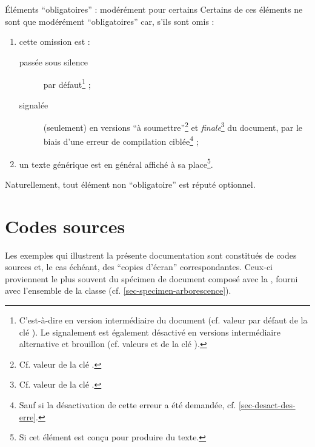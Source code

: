 \begin{dbremark}{Éléments \enquote{obligatoires} : modérément pour certains}{}
  Certains de ces éléments ne sont que modérément \enquote{obligatoires} car,
  s'ils sont omis :
  \begin{enumerate}
  \item cette omission est :
    \begin{description}
    \item[passée sous silence] par défaut\footnote{C'est-à-dire en version
        intermédiaire du document (cf. valeur par défaut 
        de la clé ). Le signalement est également désactivé en
        versions intermédiaire alternative et brouillon (cf. valeurs
         et  de la clé
        ).} ;
    \item[signalée] (seulement) en versions \enquote{à
        soumettre}\footnote{Cf. valeur  de la clé
        .} et \emph{finale}\footnote{Cf. valeur 
        de la clé .} du document, par le biais d'une erreur de
      compilation
      ciblée\footnote{Sauf si la désactivation de cette erreur a été demandée,
        cf. \vref{sec-desact-des-erre}.} ;
    \end{description}
  \item un texte générique est en général affiché à sa place\footnote{Si cet
      élément est conçu pour produire du texte.}.
  \end{enumerate}
\end{dbremark}

Naturellement, tout élément non \enquote{obligatoire} est réputé optionnel.

\section{Codes sources}
\label{sec-codes-sources}
%

Les exemples qui illustrent la présente documentation sont constitués de codes
sources et, le cas échéant, des \enquote{copies d'écran} correspondantes.
Ceux-ci proviennent le plus souvent du spécimen de document composé avec la
\yatCl, fourni avec l'ensemble de la classe
(cf. \vref{sec-specimen-arborescence}).

